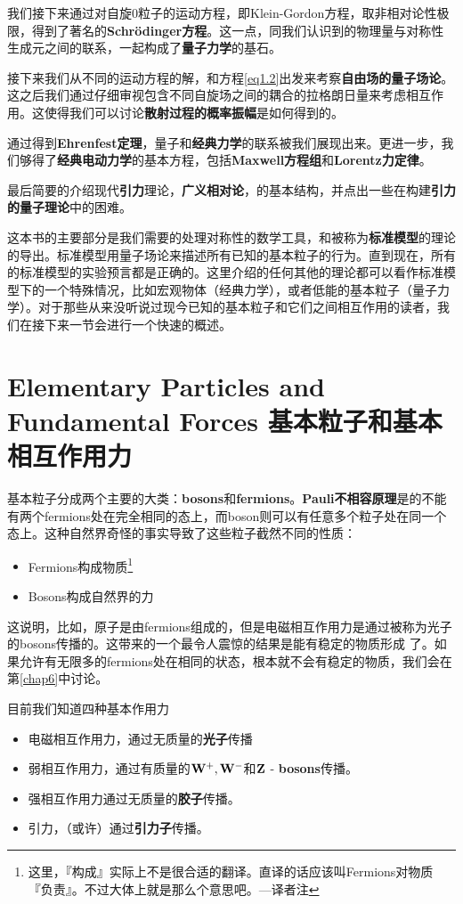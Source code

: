 我们接下来通过对自旋$0$粒子的运动方程，即Klein-Gordon方程，取非相对论性极限，得到了著名的{\bf Schrödinger方程}。这一点，同我们认识到的物理量与对称性生成元之间的联系，一起构成了{\bf 量子力学}的基石。

接下来我们从不同的运动方程的解，和方程\eqref{eq1.2}出发来考察{\bf 自由场的量子场论}。这之后我们通过仔细审视包含不同自旋场之间的耦合的拉格朗日量来考虑相互作用。这使得我们可以讨论{\bf 散射过程的概率振幅}是如何得到的。

通过得到{\bf Ehrenfest定理}，量子和{\bf 经典力学}的联系被我们展现出来。更进一步，我们够得了{\bf 经典电动力学}的基本方程，包括{\bf Maxwell方程组}和{\bf Lorentz力定律}。

最后简要的介绍现代{\bf 引力}理论，{\bf 广义相对论}，的基本结构，并点出一些在构建{\bf 引力的量子理论}中的困难。

这本书的主要部分是我们需要的处理对称性的数学工具，和被称为{\bf 标准模型}的理论的导出。标准模型用量子场论来描述所有已知的基本粒子的行为。直到现在，所有的标准模型的实验预言都是正确的。这里介绍的任何其他的理论都可以看作标准模型下的一个特殊情况，比如宏观物体（经典力学），或者低能的基本粒子（量子力学）。对于那些从来没听说过现今已知的基本粒子和它们之间相互作用的读者，我们在接下来一节会进行一个快速的概述。

\section[基本粒子和基本相互作用力]{Elementary Particles and Fundamental Forces 基本粒子和基本相互作用力}\label{sec1.3}

基本粒子分成两个主要的大类：{\bf bosons}和{\bf fermions}。{\bf Pauli不相容原理}是的不能有两个fermions处在完全相同的态上，而boson则可以有任意多个粒子处在同一个态上。这种自然界奇怪的事实导致了这些粒子截然不同的性质：

\begin{itemize}
\item Fermions构成物质\footnote{这里，『构成』实际上不是很合适的翻译。直译的话应该叫Fermions对物质『负责』。不过大体上就是那么个意思吧。---译者注}
\item Bosons构成自然界的力
\end{itemize}

这说明，比如，原子是由fermions组成的，但是电磁相互作用力是通过被称为光子的bosons传播的。这带来的一个最令人震惊的结果是能有稳定的物质形成 了。如果允许有无限多的fermions处在相同的状态，根本就不会有稳定的物质，我们会在第\ref{chap6}中讨论。

目前我们知道四种基本作用力

\begin{itemize}
\item 电磁相互作用力，通过无质量的{\bf 光子}传播
\item 弱相互作用力，通过有质量的$\bf W^+, W^-$和$\bf Z$ - {\bf bosons}传播。
\item 强相互作用力通过无质量的{\bf 胶子}传播。
\item 引力，（或许）通过{\bf 引力子}传播。
\end{itemize}










